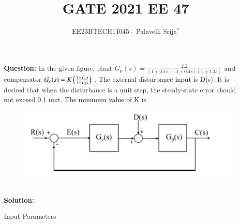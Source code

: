\documentclass[journal,12pt,twocolumn]{IEEEtran}
\theoremstyle{remark}
\begin{document}
{\small


\vspace{3cm}

\title{GATE 2021 EE 47}
\author{EE23BTECH11045 - Palavelli Srija$^{*}$}

\maketitle

\bigskip

\renewcommand{\thefigure}{\theenumi}
\renewcommand{\thetable}{\theenumi}

\vspace{3cm}
\textbf{Question:} 
In the given figure, plant $G_p(s)=\frac{2.2}{(1+0.1s)(1+0.4s)(1+1.2s)}$ and compensator $G_c(s)=K\left(\frac{1+T_1s}{1+T_2s}\right)$ . The external disturbance input is D(s). It is desired that when the disturbance is a unit step, the steady-state error should not exceed 0.1 unit. The minimum value of K is
\begin{figure}[h!]
    \centering
    \includegraphics[width=\columnwidth]{2021/EE/47/figs/fig.png}
    \caption{}
    \label{fig:sr47}
\end{figure}
\\
\textbf{Solution:}\\
\fi
\begin{table}[h!]
    \centering
    
    \caption{Input Parameters}
\end{table}
 
}
\end{document}
